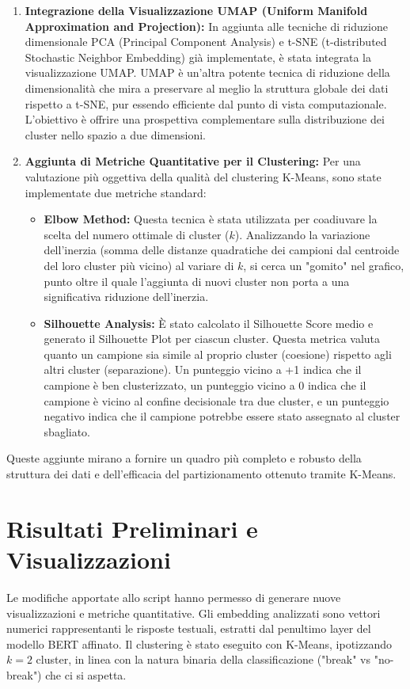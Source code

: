 \documentclass[11pt, a4paper]{article}
\begin{document}
\begin{enumerate}
    \item \textbf{Integrazione della Visualizzazione UMAP (Uniform Manifold Approximation and Projection):}
    In aggiunta alle tecniche di riduzione dimensionale PCA (Principal Component Analysis) e t-SNE (t-distributed Stochastic Neighbor Embedding) già implementate, è stata integrata la visualizzazione UMAP. UMAP è un'altra potente tecnica di riduzione della dimensionalità che mira a preservare al meglio la struttura globale dei dati rispetto a t-SNE, pur essendo efficiente dal punto di vista computazionale. L'obiettivo è offrire una prospettiva complementare sulla distribuzione dei cluster nello spazio a due dimensioni.

    \item \textbf{Aggiunta di Metriche Quantitative per il Clustering:}
    Per una valutazione più oggettiva della qualità del clustering K-Means, sono state implementate due metriche standard:
    \begin{itemize}
        \item \textbf{Elbow Method:} Questa tecnica è stata utilizzata per coadiuvare la scelta del numero ottimale di cluster ($k$). Analizzando la variazione dell'inerzia (somma delle distanze quadratiche dei campioni dal centroide del loro cluster più vicino) al variare di $k$, si cerca un "gomito" nel grafico, punto oltre il quale l'aggiunta di nuovi cluster non porta a una significativa riduzione dell'inerzia.
        \item \textbf{Silhouette Analysis:} È stato calcolato il Silhouette Score medio e generato il Silhouette Plot per ciascun cluster. Questa metrica valuta quanto un campione sia simile al proprio cluster (coesione) rispetto agli altri cluster (separazione). Un punteggio vicino a +1 indica che il campione è ben clusterizzato, un punteggio vicino a 0 indica che il campione è vicino al confine decisionale tra due cluster, e un punteggio negativo indica che il campione potrebbe essere stato assegnato al cluster sbagliato.
    \end{itemize}
\end{enumerate}
Queste aggiunte mirano a fornire un quadro più completo e robusto della struttura dei dati e dell'efficacia del partizionamento ottenuto tramite K-Means.

\section{Risultati Preliminari e Visualizzazioni}
Le modifiche apportate allo script hanno permesso di generare nuove visualizzazioni e metriche quantitative. Gli embedding analizzati sono vettori numerici rappresentanti le risposte testuali, estratti dal penultimo layer del modello BERT affinato. Il clustering è stato eseguito con K-Means, ipotizzando $k=2$ cluster, in linea con la natura binaria della classificazione ("break" vs "no-break") che ci si aspetta.
\end{document}
